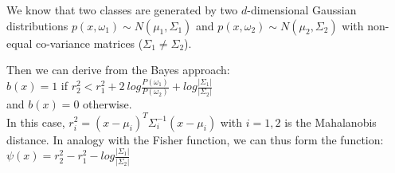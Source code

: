 \documentclass{article}
\begin{document}
We know that two classes are generated by two $d$-dimensional Gaussian distributions $p(x, \omega_1 ) \sim N (\mu_1 , \Sigma_1 )$ and $p(x, \omega_2 ) \sim N (\mu_2 , \Sigma_2 )$ with non-equal co-variance matrices ($\Sigma_1 \neq \Sigma_2$).

Then we can derive from the Bayes approach: \\ 
$b(x) = 1$ if $r_2^2 < r_1^2 + 2\ log \frac{P (\omega_1)}{P(\omega_2)} + log \frac{|\Sigma_1|}{|\Sigma_2|}$ \\
and $b(x) = 0$ otherwise. \\

In this case, $r_i^2 = (x − \mu_i )^T \Sigma_i^{−1} (x − \mu_i )$ with $i = 1, 2$ is the Mahalanobis distance. 
In analogy with the Fisher function, we can thus form the function: \\
$\psi (x) = r_2^2 - r_1^2 - log \frac{|\Sigma_1|}{|\Sigma_2|}$
\end{document}
